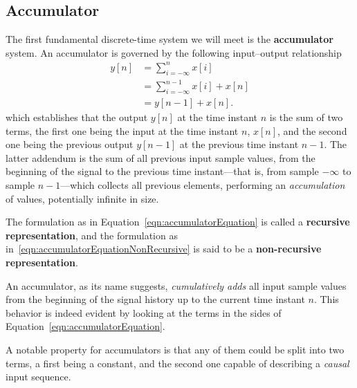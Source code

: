 \documentclass[\documentfontsize, twocolumn]{\classname}
\begin{document}
\subsection{Accumulator}

The first fundamental discrete-time system we will meet is the \textbf{accumulator} system. An accumulator is governed by the following input--output relationship
\begin{align}\label{eqn:accumulatorEquationNonRecursive}
    y[n] &= \sum_{i=-\infty}^{n} x[i] \\
         &= \sum_{i=-\infty}^{n-1} x[i] + x[n]\\
         &= y[n-1] + x[n].\label{eqn:accumulatorEquation}
\end{align}
which establishes that the output $y[n]$ at the time instant $n$ is the sum of two terms, the first one being the input at the time instant $n$, $x[n]$, and the second one being the previous output $y[n-1]$ at the previous time instant $n-1$. The latter addendum is the sum of all previous input sample values, from the beginning of the signal to the previous time instant---that is, from sample $-\infty$ to sample $n-1$---which collects all previous elements, performing an \emph{accumulation} of values, potentially infinite in size.

The formulation as in Equation~\ref{eqn:accumulatorEquation} is called a \textbf{recursive representation}, and the formulation as in~\ref{eqn:accumulatorEquationNonRecursive} is said to be a \textbf{non-recursive representation}.

An accumulator, as its name suggests, \emph{cumulatively adds} all input sample values from the beginning of the signal history up to the current time instant $n$. This behavior is indeed evident by looking at the terms in the sides of Equation~\ref{eqn:accumulatorEquation}.

A notable property for accumulators is that any of them could be split into two terms, a first being a constant, and the second one capable of describing a \emph{causal} input sequence.
\end{document}
